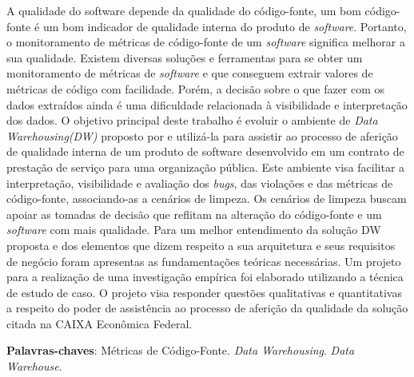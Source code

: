 \begin{resumo}




A qualidade do software depende da qualidade do código-fonte, um bom código-fonte é um bom indicador de qualidade interna do produto de \textit{software}. Portanto, o monitoramento de métricas de código-fonte de um \textit{software} significa melhorar a sua qualidade. Existem diversas soluções e ferramentas para se obter um monitoramento de métricas de \textit{software} e que conseguem extrair valores de métricas de código com facilidade. Porém, a decisão sobre o que fazer com os dados extraídos ainda é uma dificuldade relacionada à visibilidade e interpretação dos dados. O objetivo principal deste trabalho é evoluir o ambiente de \textit{Data Warehousing(DW)} proposto por  e utilizá-la para assistir ao processo de aferição de qualidade interna de um produto de software desenvolvido em um contrato de prestação de serviço para uma organização pública. Este ambiente visa facilitar a interpretação, visibilidade e avaliação dos \textit{bugs}, das violações e das métricas de código-fonte, associando-as a cenários de limpeza. Os cenários de limpeza buscam apoiar as tomadas de decisão que reflitam na alteração do código-fonte e um \textit{software} com mais qualidade. Para um melhor entendimento da solução DW proposta e dos elementos que dizem respeito a sua arquitetura e seus requisitos de negócio foram apresentas as fundamentações teóricas necessárias. Um projeto para a realização de uma investigação empírica foi elaborado utilizando a técnica de estudo de caso. O projeto visa responder questões qualitativas e quantitativas a respeito do poder de assistência ao processo de aferição da qualidade da solução citada na CAIXA Econômica Federal.
 
 

 \vspace{\onelineskip}
    
 \noindent
 \textbf{Palavras-chaves}: Métricas de Código-Fonte. \textit{Data Warehousing}. \textit{Data Warehouse}.
\end{resumo}

